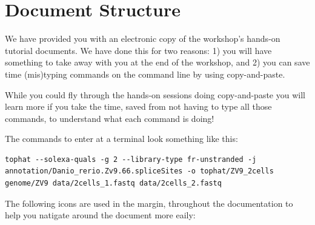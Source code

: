 \section{Document Structure}
We have provided you with an electronic copy of the workshop's hands-on tutorial documents.
We have done this for two reasons: 1) you will have something to take away with you at the 
end of the workshop, and 2) you can save time (mis)typing commands on the command line by using
copy-and-paste.

\begin{warning}
While you could fly through the hands-on sessions doing
copy-and-paste you will learn more if you take the time, saved from not having to type all those
commands, to understand what each command is doing!
\end{warning}

The commands to enter at a terminal look something like this:
\begin{lstlisting}
tophat --solexa-quals -g 2 --library-type fr-unstranded -j annotation/Danio_rerio.Zv9.66.spliceSites -o tophat/ZV9_2cells genome/ZV9 data/2cells_1.fastq data/2cells_2.fastq
\end{lstlisting}  

The following icons are used in the margin, throughout the documentation to help
you natigate around the document more eaily:

